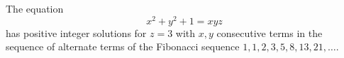 \begin{proposition}
    The equation
\[
    x^2+y^2+1=xyz
\]
    has positive integer solutions for $z=3$ with $x,y$ consecutive terms in the sequence of alternate terms of the Fibonacci sequence $1,1,2,3,5,8,13,21,\ldots$.
\end{proposition}
